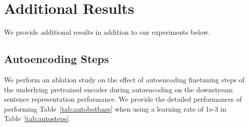 

\section{Additional Results}
We provide additional results in addition to our experiments below.

\subsection{Autoencoding Steps}

We perform an ablation study on the effect of autoencoding finetuning steps of the underlying pretrained encoder during autoencoding on the downstream sentence representation performance. We provide the detailed performances of performing Table~\ref{tab:autobotbase} when using a learning rate of 1e-3 in Table~\ref{tab:autosteps}.


